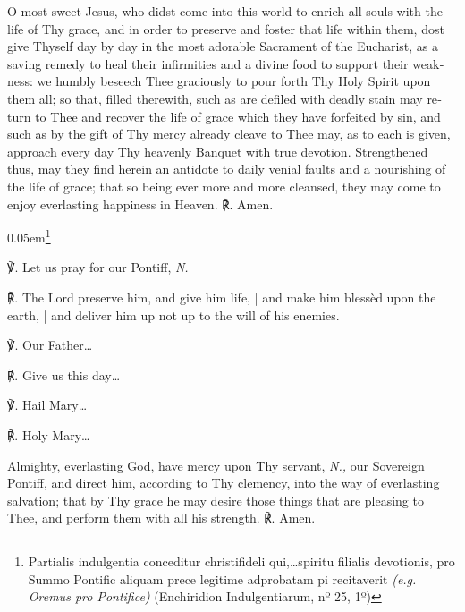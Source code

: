 \begin{otherlanguage}{english}{\par}


O most sweet Jesus, who didst come into this world to enrich all souls with the life of Thy grace, and in order to preserve and foster that life within them, dost give Thyself day by day in the most adorable Sacrament of the Eucharist, as a saving remedy to heal their infirmities and a divine food to support their weakness: we humbly beseech Thee graciously to pour forth Thy Holy Spirit upon them all; so that, filled therewith, such as are defiled with deadly stain may return to Thee and recover the life of grace which they have forfeited by sin, and such as by the gift of Thy mercy already cleave to Thee may, as to each is given, approach every day Thy heavenly Banquet with true devotion. Strengthened thus, may they find herein an antidote to daily venial faults and a nourishing of the life of grace; that so being ever more and more cleansed, they may come to enjoy everlasting happiness in Heaven. ℟. Amen.

\kern 0.05em\footnote{\raggedright{Partialis indulgentia conceditur christifideli qui,…spiritu filialis devotionis, pro Summo Pontific aliquam prece legitime adprobatam pi recitaverit \textit{(e.g. Oremus pro Pontifice)} (Enchiridion Indulgentiarum, nº 25, 1º)}}

\noindent ℣. Let us pray for our Pontiff, \textit{N.}

\noindent ℟. The Lord preserve him, and give him life, | and make him blessèd upon the earth, | and deliver him up not up to the will of his enemies.

\noindent ℣. Our Father…

\noindent ℟. Give us this day…

\noindent ℣. Hail Mary…

\noindent ℟. Holy Mary…


Almighty, everlasting God, have mercy upon Thy servant, \textit{N.,} our Sovereign Pontiff, and direct him, according to Thy clemency, into the way of everlasting salvation; that by Thy grace he may desire those things that are pleasing to Thee, and perform them with all his strength. ℟. Amen.



\end{otherlanguage}